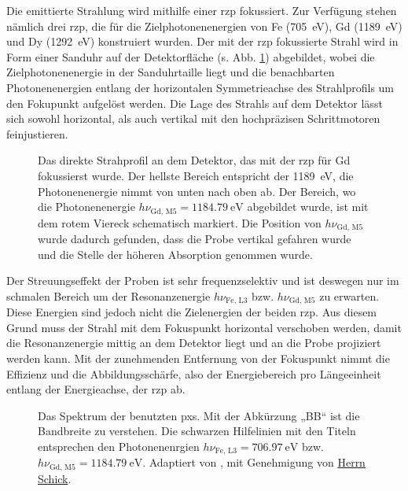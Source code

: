 \noindent
Die emittierte Strahlung wird mithilfe einer \gls{rzp} fokussiert. Zur Verfügung stehen nämlich drei \gls{rzp}, die für die Zielphotonenenergien von Fe (\SI{705}{\eV}), Gd (\SI{1189}{\eV}) und Dy (\SI{1292}{\eV}) konstruiert wurden. Der mit der \gls{rzp} fokussierte Strahl wird in Form einer Sanduhr auf der Detektorfläche (s. Abb. \ref{fig:butterfly_moench}) abgebildet, wobei die Zielphotonenenergie in der Sanduhrtaille liegt und die benachbarten Photonenenergien entlang der horizontalen Symmetrieachse des Strahlprofils um den Fokupunkt aufgelöst werden. Die Lage des Strahls auf dem Detektor lässt sich sowohl horizontal, als auch vertikal mit den hochpräzisen Schrittmotoren feinjustieren.
\begin{figure}[H]
    \centering
    
    \caption{Das direkte Strahprofil an dem Detektor, das mit der \gls{rzp} für Gd fokussierst wurde. Der hellste Bereich entspricht der \SI{1189}{\eV}, die Photonenenergie nimmt von unten nach oben ab. Der Bereich, wo die Photonenenergie $h\nu_{\text{Gd, M5}} = \SI{1184,79}{\eV}$ abgebildet wurde, ist mit dem rotem Viereck schematisch markiert. Die Position von $h\nu_{\text{Gd, M5}}$ wurde dadurch gefunden, dass die Probe vertikal gefahren wurde und die Stelle der höheren Absorption genommen wurde.}
    \label{fig:butterfly_moench}
\end{figure}
\noindent
Der Streuungseffekt der Proben ist sehr frequenzselektiv und ist deswegen nur im schmalen Bereich um der Resonanzenergie $h\nu_{\text{Fe, L3}}$ bzw. $h\nu_{\text{Gd, M5}}$ zu erwarten. Diese Energien sind jedoch nicht die Zielenergien der beiden \gls{rzp}. Aus diesem Grund muss der Strahl mit dem Fokuspunkt horizontal verschoben werden, damit die Resonanzenergie mittig an dem Detektor liegt und an die Probe projiziert werden kann. Mit der zunehmenden Entfernung von der Fokuspunkt nimmt die Effizienz und die Abbildungsschärfe, also der Energiebereich pro Längeeinheit entlang der Energieachse, der \gls{rzp} ab. 
\begin{figure}[H]
    \centering
    
    \caption{Das Spektrum der benutzten \gls{pxs}. Mit der Abkürzung „BB“ ist die Bandbreite zu verstehen. Die schwarzen Hilfelinien mit den Titeln entsprechen den Photonenenrgien $h\nu_{\text{Fe, L3}} = \SI{706.97}{\eV}$ bzw. $h\nu_{\text{Gd, M5}} = \SI{1184,79}{\eV}$. Adaptiert von \cite{schick_laser-driven_2021}, mit Genehmigung von \href{https://orcid.org/0000-0001-7988-6489}{Herrn Schick}.}
    \label{fig:xps_spectrum}
\end{figure}

